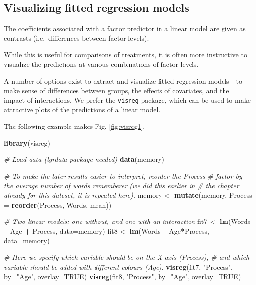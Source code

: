 \documentclass[]{book}
\newenvironment{Shaded}{\begin{snugshade}}{\end{snugshade}}
\newcommand{\CommentTok}[1]{\textcolor[rgb]{0.56,0.35,0.01}{\textit{#1}}}
\newcommand{\DataTypeTok}[1]{\textcolor[rgb]{0.13,0.29,0.53}{#1}}
\newcommand{\KeywordTok}[1]{\textcolor[rgb]{0.13,0.29,0.53}{\textbf{#1}}}
\newcommand{\NormalTok}[1]{#1}
\newcommand{\OperatorTok}[1]{\textcolor[rgb]{0.81,0.36,0.00}{\textbf{#1}}}
\newcommand{\OtherTok}[1]{\textcolor[rgb]{0.56,0.35,0.01}{#1}}
\newcommand{\StringTok}[1]{\textcolor[rgb]{0.31,0.60,0.02}{#1}}
\begin{document}
\hypertarget{predictedeffects}{%
\subsection{Visualizing fitted regression models}\label{predictedeffects}}

The coefficients associated with a factor predictor in a linear model are given as contrasts (i.e.~differences between factor levels).

While this is useful for comparisons of treatments, it is often more instructive to visualize the predictions at various combinations of factor levels.

A number of options exist to extract and visualize fitted regression models - to make sense of differences between groups, the effects of covariates, and the impact of interactions. We prefer the \texttt{visreg} package, which can be used to make attractive plots of the predictions of a linear model.

The following example makes Fig. \ref{fig:visreg1}.

\begin{Shaded}
\begin{Highlighting}[]
\KeywordTok{library}\NormalTok{(visreg)}

\CommentTok{# Load data (lgrdata package needed)}
\KeywordTok{data}\NormalTok{(memory)}

\CommentTok{# To make the later results easier to interpret, reorder the Process}
\CommentTok{# factor by the average number of words rememberer (we did this earlier in }
\CommentTok{# the chapter already for this dataset, it is repeated here).}
\NormalTok{memory <-}\StringTok{ }\KeywordTok{mutate}\NormalTok{(memory, }
                 \DataTypeTok{Process =} \KeywordTok{reorder}\NormalTok{(Process, Words, mean))}

\CommentTok{# Two linear models: one without, and one with an interaction}
\NormalTok{fit7 <-}\StringTok{ }\KeywordTok{lm}\NormalTok{(Words }\OperatorTok{~}\StringTok{ }\NormalTok{Age }\OperatorTok{+}\StringTok{ }\NormalTok{Process, }\DataTypeTok{data=}\NormalTok{memory)}
\NormalTok{fit8 <-}\StringTok{ }\KeywordTok{lm}\NormalTok{(Words }\OperatorTok{~}\StringTok{ }\NormalTok{Age}\OperatorTok{*}\NormalTok{Process, }\DataTypeTok{data=}\NormalTok{memory)}

\CommentTok{# Here we specify which variable should be on the X axis (Process),}
\CommentTok{# and which variable should be added with different colours (Age).}
\KeywordTok{visreg}\NormalTok{(fit7, }\StringTok{"Process"}\NormalTok{, }\DataTypeTok{by=}\StringTok{"Age"}\NormalTok{, }\DataTypeTok{overlay=}\OtherTok{TRUE}\NormalTok{)}
\KeywordTok{visreg}\NormalTok{(fit8, }\StringTok{"Process"}\NormalTok{, }\DataTypeTok{by=}\StringTok{"Age"}\NormalTok{, }\DataTypeTok{overlay=}\OtherTok{TRUE}\NormalTok{)}
\end{Highlighting}
\end{Shaded}
\end{document}
